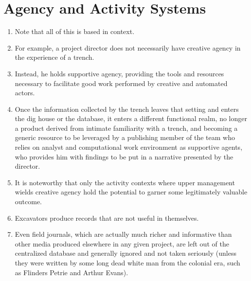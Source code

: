 \documentclass{article}
\begin{document}
\section{Agency and Activity Systems}
\begin{enumerate}
  \item Note that all of this is based in context.
  \item For example, a project director does not necessarily have creative agency in the experience of a trench.
  \item Instead, he holds supportive agency, providing the tools and resources necessary to facilitate good work performed by creative and automated actors.
  \item Once the information collected by the trench leaves that setting and enters the dig house or the database, it enters a different functional realm, no longer a product derived from intimate familiarity with a trench, and becoming a generic resource to be leveraged by a publishing member of the team who relies on analyst and computational work environment as supportive agents, who provides him with findings to be put in a narrative presented by the director.
  \item It is noteworthy that only the activity contexts where upper management wields creative agency hold the potential to garner some legitimately valuable outcome.
  \item Excavators produce records that are not useful in themselves.
  \item Even field journals, which are actually much richer and informative than other media produced elsewhere in any given project, are left out of the centralized database and generally ignored and not taken seriously (unless they were written by some long dead white man from the colonial era, such as Flinders Petrie and Arthur Evans).
\end{enumerate}
\end{document}
